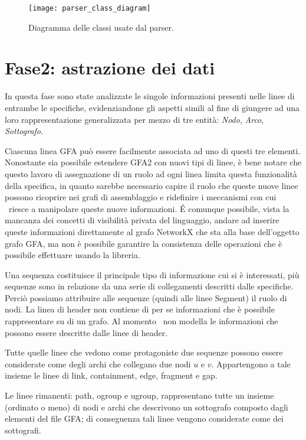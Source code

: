 \captionsetup{justification=centering}
\begin{figure}[h]
	\centering
	\texttt{[image: parser\_class\_diagram]}
	\caption[Diagramma delle classi del package parser]{Diagramma delle classi usate dal parser.}
\end{figure}
\captionsetup{justification=justified}
\clearpage

\section{Fase2: astrazione dei dati}
In questa fase sono state analizzate le singole informazioni presenti
nelle linee di entrambe le specifiche, evidenziandone gli aspetti simili al
fine di giungere ad una loro rappresentazione generalizzata per mezzo di tre
entità: \emph{Nodo}, \emph{Arco}, \emph{Sottografo}.

Ciascuna linea GFA può essere facilmente associata ad uno di questi tre
elementi. Nonostante sia possibile estendere GFA2 con nuovi tipi di linee, è bene notare
che questo lavoro di assegnazione di un ruolo ad ogni linea limita questa funzionalità
della specifica, in quanto sarebbe necessario capire il ruolo che queste nuove
linee possono ricoprire nei grafi di assemblaggio e ridefinire i meccanismi con
cui \pygfa \  riesce a manipolare queste nuove informazioni. \'E comunque possibile,
vista la mancanza dei concetti di visibilità privata del linguaggio, andare ad inserire
queste informazioni direttamente al grafo NetworkX che sta alla base dell'oggetto grafo
GFA, ma non è possibile garantire la consistenza delle operazioni che è possibile
effettuare usando la libreria.

Una sequenza costituisce il principale tipo di informazione cui si
è interessati, più sequenze sono in relazione da una serie di collegamenti descritti
dalle specifiche. Perciò possiamo attribuire alle sequenze (quindi alle linee Segment)
il ruolo di nodi.
La linea di header non contiene di per se informazioni che è possibile rappresentare
su di un grafo. Al momento \pygfa \  non modella le informazioni che possono essere
descritte dalle linee di header.

Tutte quelle linee che vedono come protagoniste due sequenze possono essere
considerate come degli archi che collegano due nodi $u$ e $v$. Appartengono
a tale insieme le linee di link, containment, edge, fragment e gap.

Le linee rimanenti: path, ogroup e ugroup, rappresentano tutte un insieme
(ordinato o meno) di nodi e archi che descrivono un sottografo composto
dagli elementi del file GFA; di conseguenza tali linee vengono considerate come
dei sottografi.

